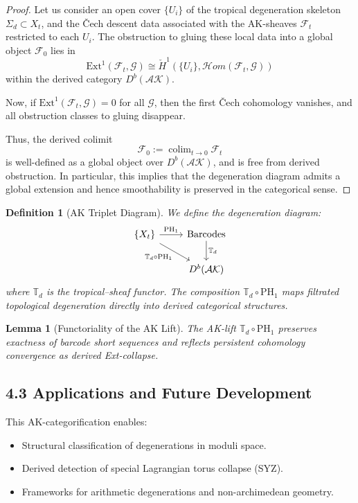\documentclass[11pt]{article}
\DeclareMathOperator{\colim}{colim}
\newtheorem{definition}[theorem]{Definition}
\newtheorem{lemma}[theorem]{Lemma}
\begin{document}
\begin{proof}
Let us consider an open cover \( \{U_i\} \) of the tropical degeneration skeleton \( \Sigma_d \subset X_t \),  
and the Čech descent data associated with the AK-sheaves \( \mathcal{F}_t \) restricted to each \( U_i \).  
The obstruction to gluing these local data into a global object \( \mathcal{F}_0 \) lies in  
\[
\mathrm{Ext}^1(\mathcal{F}_t, \mathcal{G}) \cong \check{H}^1(\{U_i\}, \mathcal{H}om(\mathcal{F}_t, \mathcal{G}))
\]
within the derived category \( D^b(\mathcal{AK}) \).

Now, if \( \mathrm{Ext}^1(\mathcal{F}_t, \mathcal{G}) = 0 \) for all \( \mathcal{G} \),  
then the first Čech cohomology vanishes, and all obstruction classes to gluing disappear.

Thus, the derived colimit
\[
\mathcal{F}_0 := \colim_{t \to 0} \mathcal{F}_t
\]
is well-defined as a global object over \( D^b(\mathcal{AK}) \), and is free from derived obstruction.  
In particular, this implies that the degeneration diagram admits a global extension and hence smoothability is preserved in the categorical sense.
\end{proof}

\begin{definition}[AK Triplet Diagram]
We define the degeneration diagram:
\[
\begin{tikzcd}
\{X_t\} \arrow[r, "\mathrm{PH}_1"] \arrow[dr, swap, "\mathbb{T}_d \circ \mathrm{PH}_1"] & \text{Barcodes} \arrow[d, "\mathbb{T}_d"] \\
& D^b(\mathcal{AK})
\end{tikzcd}
\]
where $\mathbb{T}_d$ is the tropical--sheaf functor. The composition $\mathbb{T}_d \circ \mathrm{PH}_1$ maps filtrated topological degeneration directly into derived categorical structures.
\end{definition}

\begin{lemma}[Functoriality of the AK Lift]
The AK-lift $\mathbb{T}_d \circ \mathrm{PH}_1$ preserves exactness of barcode short sequences and reflects persistent cohomology convergence as derived Ext-collapse.
\end{lemma}

\subsection{4.3 Applications and Future Development}

This AK-categorification enables:
\begin{itemize}
    \item Structural classification of degenerations in moduli space.
    \item Derived detection of special Lagrangian torus collapse (SYZ).
    \item Frameworks for arithmetic degenerations and non-archimedean geometry.
\end{itemize}
\end{document}
